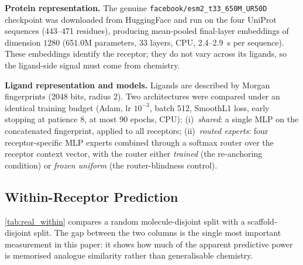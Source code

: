\textbf{Protein representation.} The genuine \texttt{facebook/esm2\_t33\_650M\_UR50D} checkpoint was downloaded from HuggingFace and run on the four UniProt sequences (443--471 residues), producing mean-pooled final-layer embeddings of dimension $1280$ (651.0M parameters, 33 layers, CPU, 2.4--2.9~s per sequence). These embeddings identify the receptor; they do not vary across its ligands, so the ligand-side signal must come from chemistry.

\textbf{Ligand representation and models.} Ligands are described by Morgan fingerprints (2048 bits, radius 2). Two architectures were compared under an identical training budget (Adam, lr $10^{-3}$, batch 512, SmoothL1 loss, early stopping at patience 8, at most 90 epochs, CPU):
(i)~\emph{shared}: a single MLP on the concatenated fingerprint, applied to all receptors;
(ii)~\emph{routed experts}: four receptor-specific MLP experts combined through a softmax router over the receptor context vector, with the router either \emph{trained} (the re-anchoring condition) or \emph{frozen uniform} (the router-blindness control).

\subsection{Within-Receptor Prediction}

\cref{tab:real_within} compares a random molecule-disjoint split with a scaffold-disjoint split. The gap between the two columns is the single most important measurement in this paper: it shows how much of the apparent predictive power is memorised analogue similarity rather than generalisable chemistry.

\begin{table}[!ht]
\centering
\small
\caption{\textbf{Real measured within-receptor affinity prediction.} Both columns are measurements on held-out ChEMBL molecules. For the scaffold column the Bemis--Murcko scaffold overlap between train and test is exactly $0$ (verified), so these are genuinely unseen chemotypes.}
\label{tab:real_within}
\end{table}

